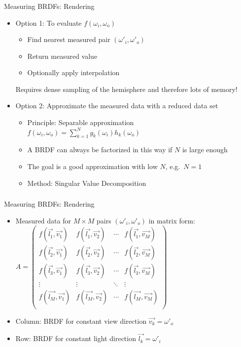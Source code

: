 \documentclass[utf8,stillsansserifmath,fleqn,t]{beamer}
\newcommand{\ds}{\displaystyle}
\begin{document}
\begin{frame}
\frametitle{\insertsection}
Measuring BRDFs: Rendering
\begin{itemize}
\item Option 1: To evaluate $f(\omega_i,\omega_o)$
    \begin{itemize}
    \item Find nearest measured pair $(\omega'_i, \omega'_o)$
    \item Return measured value
    \item Optionally apply interpolation
    \end{itemize}
    Requires dense sampling of the hemisphere and therefore lots of memory!
\item Option 2: Approximate the measured data with a reduced data set
    \begin{itemize}
    \item Principle: Separable approximation\\
$\ds f(\omega_i,\omega_o) = \sum_{k=1}^N g_k(\omega_i) h_k(\omega_o)$
    \item A BRDF can always be factorized in this way if $N$ is large enough
    \item The goal is a good approximation with low $N$, e.g.~$N=1$
    \item Method: Singular Value Decomposition
    \end{itemize}
\end{itemize}
\end{frame}

\begin{frame}
\frametitle{\insertsection}
Measuring BRDFs: Rendering
\begin{itemize}
\item Measured data for $M\times M$ pairs $(\omega'_i,\omega'_o)$ in matrix form:\\
$\displaystyle A = 
    \begin{pmatrix}
    f(\vec{l_1},\vec{v_1}) & f(\vec{l_1},\vec{v_2}) & \cdots & f(\vec{l_1},\vec{v_M})\\
    f(\vec{l_2},\vec{v_1}) & f(\vec{l_2},\vec{v_2}) & \cdots & f(\vec{l_2},\vec{v_M})\\
    f(\vec{l_3},\vec{v_1}) & f(\vec{l_3},\vec{v_2}) & \cdots & f(\vec{l_3},\vec{v_M})\\
    \vdots                 & \vdots                & \ddots & \vdots\\
    f(\vec{l_M},\vec{v_1}) & f(\vec{l_M},\vec{v_2}) & \cdots & f(\vec{l_M},\vec{v_M})\\
    \end{pmatrix}$
\item Column: BRDF for constant view direction $\vec{v_k}=\omega'_o$
\item Row: BRDF for constant light direction $\vec{l_k}=\omega'_i$
\end{itemize}
\end{frame}
\end{document}
